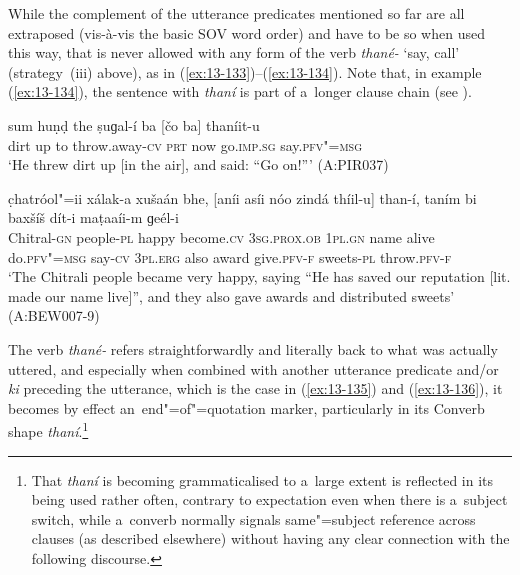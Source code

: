 While the complement of the utterance predicates mentioned so far are all extraposed (vis-à-vis the basic SOV word order) and have to be so when used this way, that is never allowed with any form of the verb \textit{thané-} `say, call' (strategy~(iii) above), as in (\ref{ex:13-133})--(\ref{ex:13-134}). Note that, in example (\ref{ex:13-134}), the sentence with \textit{thaní} is part of a~longer clause chain (see ).

\begin{exe}
\ex
\label{ex:13-133}
\gll sum huṇḍ the ṣuɡal-í ba [čo ba]  thaníit-u \\
dirt up to throw.away-\textsc{cv} \textsc{prt} now go.\textsc{imp.sg} say.\textsc{pfv"=msg} \\
\glt `He threw dirt up [in the air], and said: ``Go on!''' (A:PIR037)

\ex
\label{ex:13-134}
\gll c̣hatróol"=ii xálak-a xušaán bhe,  [aníi asíi nóo zindá thíil-u]
than-í,  taním bi baxšíš dít-i maṭaaíi-m   ɡeél-i \\
Chitral-\textsc{gn} people-\textsc{pl} happy become.\textsc{cv}  \textsc{3sg.prox.ob } \textsc{1pl.gn} name alive do.\textsc{pfv"=msg} say-\textsc{cv}  \textsc{3pl.erg} also award give.\textsc{pfv-f} sweets-\textsc{pl} throw.\textsc{pfv-f}  \\
\glt `The Chitrali people became very happy, saying ``He has saved our reputation [lit. made our name live]'', and they also gave awards and distributed sweets' (A:BEW007-9) 
\end{exe}

The verb \textit{thané-} refers straightforwardly and literally back to what was actually uttered,
and especially when combined with another utterance predicate and/or \textit{ki} preceding the
utterance, which is the case in (\ref{ex:13-135}) and (\ref{ex:13-136}), it becomes by effect
an~end"=of"=quotation marker, particularly in its Converb shape \textit{thaní}.\footnote{That
  \textit{thaní} is becoming grammaticalised to a~large extent is reflected in its being used rather
  often, contrary to expectation even when there is a~subject switch, while a~converb normally
  signals same"=subject reference across clauses (as described elsewhere) without having any clear
  connection with the following discourse.}

